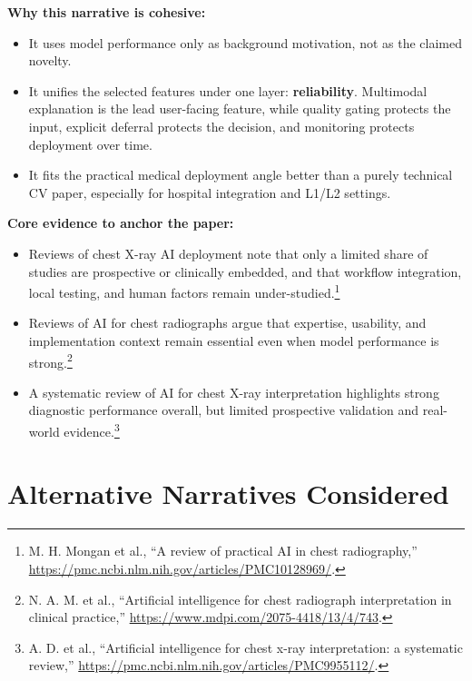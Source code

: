 \documentclass[11pt]{article}
\begin{document}
\textbf{Why this narrative is cohesive:}
\begin{itemize}[leftmargin=1.5em]
    \item It uses model performance only as background motivation, not as the claimed novelty.
    \item It unifies the selected features under one layer: \textbf{reliability}. Multimodal explanation is the lead user-facing feature, while quality gating protects the input, explicit deferral protects the decision, and monitoring protects deployment over time.
    \item It fits the practical medical deployment angle better than a purely technical CV paper, especially for hospital integration and L1/L2 settings.
\end{itemize}

\textbf{Core evidence to anchor the paper:}
\begin{itemize}[leftmargin=1.5em]
    \item Reviews of chest X-ray AI deployment note that only a limited share of studies are prospective or clinically embedded, and that workflow integration, local testing, and human factors remain under-studied.\footnote{M. H. Mongan et al., ``A review of practical AI in chest radiography,'' \url{https://pmc.ncbi.nlm.nih.gov/articles/PMC10128969/}.}
    \item Reviews of AI for chest radiographs argue that expertise, usability, and implementation context remain essential even when model performance is strong.\footnote{N. A. M. et al., ``Artificial intelligence for chest radiograph interpretation in clinical practice,'' \url{https://www.mdpi.com/2075-4418/13/4/743}.}
    \item A systematic review of AI for chest X-ray interpretation highlights strong diagnostic performance overall, but limited prospective validation and real-world evidence.\footnote{A. D. et al., ``Artificial intelligence for chest x-ray interpretation: a systematic review,'' \url{https://pmc.ncbi.nlm.nih.gov/articles/PMC9955112/}.}
\end{itemize}

\section{Alternative Narratives Considered}
\end{document}
